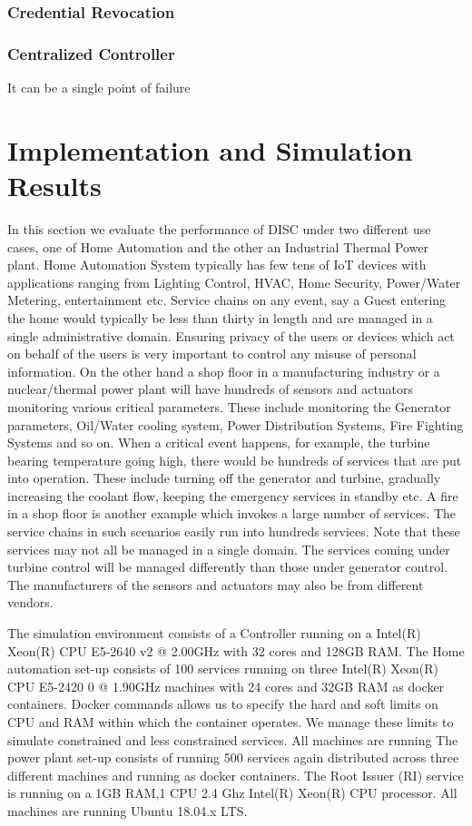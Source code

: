 \documentclass[journal]{IEEEtran}
\begin{document}
\subsubsection{Credential Revocation}

\subsubsection{Centralized Controller}
It can be a single point of failure

\section{Implementation and Simulation Results} \label{implementation}
In this section we evaluate the performance of DISC under two different use cases, one of Home Automation and the other an Industrial Thermal Power plant. Home Automation System typically has few tens of IoT devices with applications ranging from Lighting Control, HVAC, Home Security, Power/Water Metering, entertainment etc. Service chains on any event, say a Guest entering the home would typically be less than thirty in length and are managed in a single administrative domain. Ensuring privacy of the users or devices which act on behalf of the users is very important to control any misuse of personal information.
On the other hand a shop floor in a manufacturing industry or a nuclear/thermal power plant will have hundreds of sensors and actuators monitoring various critical parameters. These include monitoring the Generator parameters, Oil/Water cooling system, Power Distribution Systems, Fire Fighting Systems and so on. When a critical event happens, for example, the turbine bearing temperature going high, there would be hundreds of services that are put into operation. These include turning off the generator and turbine,  gradually increasing the coolant flow, keeping the emergency services in standby etc. A fire in a shop floor is another example which invokes a large number of services. The service chains in such scenarios easily run into hundreds services. Note that these services may not all be managed in a single domain. The services coming under turbine control will be managed differently than those under generator control. The manufacturers of the sensors and actuators may also be from different vendors.

The simulation environment consists of a Controller running on a Intel(R) Xeon(R) CPU E5-2640 v2 @ 2.00GHz with 32 cores and 128GB RAM. The Home automation set-up consists of 100 services running on three Intel(R) Xeon(R) CPU E5-2420 0 @ 1.90GHz machines with 24 cores and 32GB RAM as docker containers. Docker commands allows us to specify the hard and soft limits on CPU and RAM within which the container operates. We manage these limits to simulate constrained and less constrained services. All machines are running The power plant set-up consists of running 500 services again distributed across three different machines and running as docker containers. The Root Issuer (RI) service is running on a 1GB RAM,1 CPU 2.4 Ghz Intel(R) Xeon(R) CPU processor.  All machines are running Ubuntu 18.04.x LTS.
\end{document}
